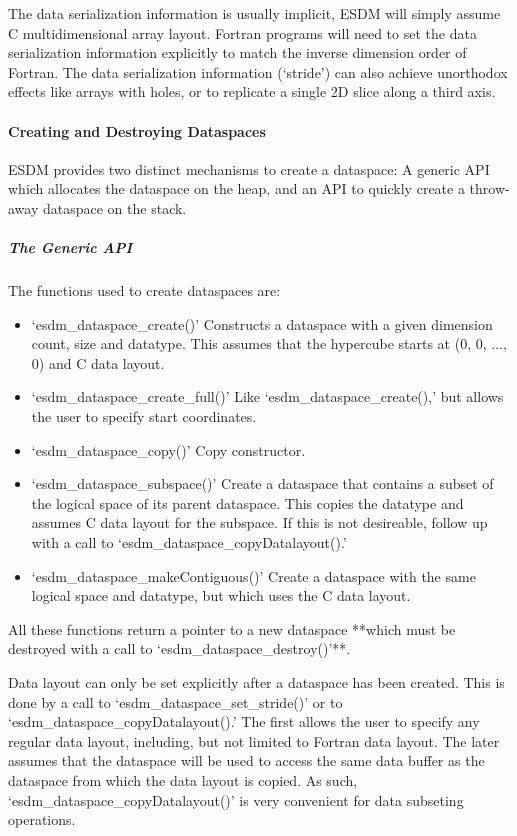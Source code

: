 The data serialization information is usually implicit, ESDM will simply
assume C multidimensional array layout. Fortran programs will need to
set the data serialization information explicitly to match the inverse
dimension order of Fortran. The data serialization information
(`stride') can also achieve unorthodox effects like arrays with holes,
or to replicate a single 2D slice along a third axis.

\paragraph{Creating and Destroying Dataspaces}%

ESDM provides two distinct mechanisms to create a dataspace: A generic
API which allocates the dataspace on the heap, and an API to quickly
create a throw-away dataspace on the stack.

\subparagraph{The Generic API}%

The functions used to create dataspaces are:

\begin{itemize}
  \item `esdm\_dataspace\_create()'
    Constructs a dataspace with a given dimension count, size and
    datatype. This assumes that the hypercube starts at (0, 0, ..., 0) and
    C data layout.
  \item `esdm\_dataspace\_create\_full()'
    Like `esdm\_dataspace\_create(),' but allows the user to specify start
    coordinates.
  \item `esdm\_dataspace\_copy()'
    Copy constructor.
  \item `esdm\_dataspace\_subspace()'
    Create a dataspace that contains a subset of the logical space of its
    parent dataspace. This copies the datatype and assumes C data layout
    for the subspace. If this is not desireable, follow up with a call to
    `esdm\_dataspace\_copyDatalayout().'
  \item `esdm\_dataspace\_makeContiguous()'
    Create a dataspace with the same logical space and datatype, but which
    uses the C data layout.
\end{itemize}

All these functions return a pointer to a new dataspace **which must be
destroyed with a call to `esdm\_dataspace\_destroy()'**.

Data layout can only be set explicitly after a dataspace has been
created. This is done by a call to `esdm\_dataspace\_set\_stride()' or
to `esdm\_dataspace\_copyDatalayout().' The first allows the user to
specify any regular data layout, including, but not limited to Fortran
data layout. The later assumes that the dataspace will be used to access
the same data buffer as the dataspace from which the data layout is
copied. As such, `esdm\_dataspace\_copyDatalayout()' is very convenient
for data subseting operations.


